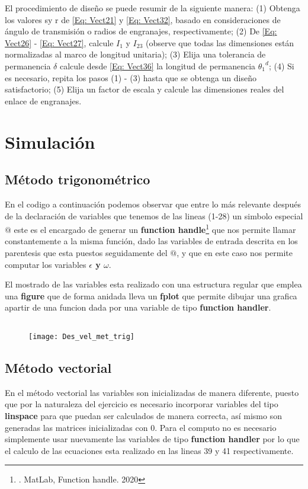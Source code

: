 \documentclass[12pt, final]{extarticle}
\begin{document}
El procedimiento de diseño se puede resumir de la siguiente manera: (1) Obtenga
los valores sy r de \eqref{Eq: Vect21} y \eqref{Eq: Vect32}, basado en
consideraciones de ángulo de transmisión o radios de engranajes,
respectivamente; (2) De \eqref{Eq: Vect26} - \eqref{Eq: Vect27}, calcule $I_1$ y
$I_{23}$ (observe que todas las dimensiones están normalizadas al marco de
longitud unitaria); (3) Elija una tolerancia de permanencia $\delta$ calcule
desde \eqref{Eq: Vect36} la longitud de permanencia ${\theta_1}^d$; (4) Si es
necesario, repita los pasos (1) - (3) hasta que se obtenga un diseño
satisfactorio; (5) Elija un factor de escala y calcule las dimensiones reales
del enlace de engranajes.

\newpage
\section{Simulación}
\subsection{Método trigonométrico}
En el codigo a continuación podemos observar que entre lo más relevante después de la declaración de variables que tenemos de las lineas (1-28) un simbolo especial $@$ este es el encargado de generar un \textbf{function handle}\footnote{\cite{Mat2020}. MatLab, Function handle. 2020} que nos permite llamar constantemente a la misma función, dado las variables de entrada descrita en los parentesis que esta puestos seguidamente del $@$, y que en este caso nos permite computar los variables \textbf{$\epsilon$ y $\omega$}. 

El mostrado de las variables esta realizado con una estructura regular que emplea una \textbf{figure} que de forma anidada lleva un \textbf{fplot} que permite dibujar una grafica apartir de una funcion dada por una variable de tipo \textbf{function handler}. 
{\small
\inputminted{matlab}{Codigos/ADA5_metodo_trig.m}}

\begin{figure}[ht]
    \centering
    \texttt{[image: Des\_vel\_met\_trig]}
\end{figure}

\newpage
\subsection{Método vectorial}
En el método vectorial las variables son inicializadas de manera diferente, puesto que por la naturaleza del ejercicio es necesario incorporar variables del tipo \textbf{linspace} para que puedan ser calculados de manera correcta, así mismo son generadas las matrices inicializadas con 0. Para el computo no es necesario simplemente usar nuevamente las variables de tipo \textbf{function handler} por lo que el calculo de las ecuaciones esta realizado en las lineas 39 y 41 respectivamente. 
\end{document}

